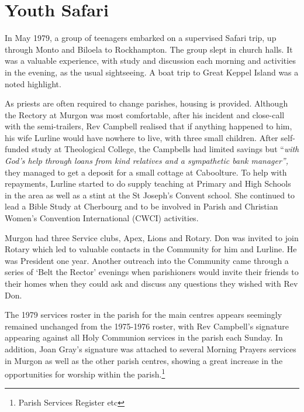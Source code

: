 \section{Youth Safari}



In May 1979, a group of teenagers embarked on a supervised Safari trip, up through Monto and Biloela to Rockhampton. The group slept in church halls. It was a valuable experience, with study and discussion each morning and activities in the evening, as the usual sightseeing. A boat trip to Great Keppel Island was a noted highlight.



As priests are often required to change parishes, housing is provided. Although the Rectory at Murgon was most comfortable, after his incident and close-call with the semi-trailers, Rev Campbell realised that if anything happened to him, his wife Lurline would have nowhere to live, with three small children. After self-funded study at Theological College, the Campbells had limited savings but ``\emph{with God's help through loans from kind relatives and a sympathetic bank manager'',} they managed to get a deposit for a small cottage at Caboolture. To help with repayments, Lurline started to do supply teaching at Primary and High Schools in the area as well as a stint at the St Joseph's Convent school. She continued to lead a Bible Study at Cherbourg and to be involved in Parish and Christian Women's Convention International (CWCI) activities.



Murgon had three Service clubs, Apex, Lions and Rotary. Don was invited to join Rotary which led to valuable contacts in the Community for him and Lurline. He was President one year. Another outreach into the Community came through a series of `Belt the Rector' evenings when parishioners would invite their friends to their homes when they could ask and discuss any questions they wished with Rev Don.



The 1979 services roster in the parish for the main centres appears seemingly remained unchanged from the 1975-1976 roster, with Rev Campbell's signature appearing against all Holy Communion services in the parish each Sunday. In addition, Joan Gray's signature was attached to several Morning Prayers services in Murgon as well as the other parish centres, showing a great increase in the opportunities for worship within the parish.\footnote{Parish Services Register etc}


